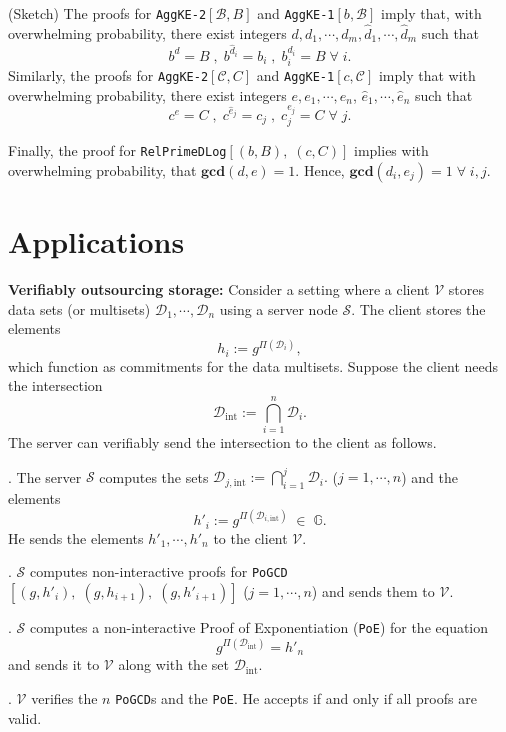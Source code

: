 \documentclass[11pt, lettersize, notitlepage, leqno, footskip=0.6cm]{article}
\newcommand{\mc}{\mathcal}
\newcommand{\mb}{\mathbb}
\newcommand{\mbf}{\mathbf}
\newcommand{\mr}{\mathrm}
\newcommand{\what}{\widehat}
\newcommand{\V}{\mc{V}}
\newcommand{\vs}{\vspace{-0.15cm}}
\newcommand{\noin}{\noindent}
\newcommand{\op}{overwhelming probability}
\newcommand{\GCD}{\mbf{gcd}}
\numberwithin{equation}{section}
\begin{document}
\begin{prf} (Sketch) The proofs for \verb|AggKE-2|$[\mc{B}, B]$ and \verb|AggKE-1|$[b,\mc{B}]$ imply that, with overwhelming probability, there exist integers $d,d_1,\cdots,d_m,\what{d}_1,\cdots,\what{d}_m$ such that \vs $$b^d = B\;,\; b^{\what{d}_i}= b_i\;,\; b_i^{d_i}= B\;\forall\; i.$$ Similarly, the proofs for \verb|AggKE-2|$[\mc{C}, C]$ and \verb|AggKE-1|$[c,\mc{C}]$ imply that with overwhelming probability, there exist integers $e,e_1,\cdots,e_n$, $\what{e}_1,\cdots,\what{e}_n$ such that \vs $$c^e = C\;,\; c^{\what{e}_j}= c_j\;,\;c_j^{e_j}= C\;\forall\; j.$$ 

Finally, the proof for \verb|RelPrimeDLog|$[(b,B),\;(c,C)]$ implies with \op, that $\GCD(d,e) = 1$. Hence, $\GCD(d_i,e_j) = 1\;\forall\;i,j$.

\end{prf}

\bigskip

\section{\fontsize{11}{11} Applications}



\noin \textbf{Verifiably outsourcing storage:} Consider a setting where a client $\mc{V}$ stores data sets (or multisets) $\mc{D}_1, \cdots, \mc{D}_n$ using a server node $\mc{S}$. The client stores the elements \vs $$h_i:= g^{\Pi(\mc{D}_i)},$$ which function as commitments for the data multisets. Suppose the client needs the intersection \vs $$\mc{D}_{\mr{int}}:=\bigcap\limits_{i=1}^n \mc{D}_i .$$ The server can verifiably send the intersection to the client as follows.\vspace{0.1cm}

\noin 1. The server $\mc{S}$ computes the sets $\mc{D}_{j,\mr{int}}:= \bigcap\limits_{i=1}^j \mc{D}_i .$ ($j=1,\cdots,n$) and the elements \vs $$ h'_i:=  g^{\Pi(\mc{D}_{i,\mr{int}})}\;\in\;\mb{G}.$$ He sends the elements $h'_1,\cdots, h'_{n}$ to the client $\V$.

\noin 2. $\mc{S}$ computes non-interactive proofs for \verb|PoGCD|$[(g,h'_i),\;(g, h_{i+1}),\; (g, h'_{i+1})]$ ($j=1,\cdots,n$) and sends them to $\V$.

\noin 3. $\mc{S}$ computes a non-interactive Proof of Exponentiation (\verb|PoE|) for the equation \vs $$g^{\Pi(\mc{D}_{\mr{int}})} = h'_n $$ and sends it to $\V$ along with the set $\mc{D}_{\mr{int}}$.

\noin 4. $\V$ verifies the $n$ \verb|PoGCD|s and the \verb|PoE|. He accepts if and only if all proofs are valid.
\end{document}
